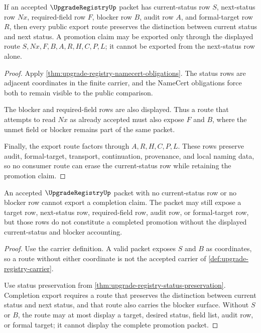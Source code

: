\begin{theorem}
\label{thm:upgrade-registry-status-preservation}
If an accepted $\UpgradeRegistryUp$ packet has current-status row $S$, next-status row $Nx$, required-field row $F$, blocker row $B$, audit row $A$, and formal-target row $R$, then every public export route preserves the distinction between current status and next status. A promotion claim may be exported only through the displayed route $S,Nx,F,B,A,R,H,C,P,L$; it cannot be exported from the next-status row alone.
\end{theorem}
\begin{proof}
Apply \autoref{thm:upgrade-registry-namecert-obligations}. The status rows are adjacent coordinates in the finite carrier, and the NameCert obligations force both to remain visible to the public comparison.

The blocker and required-field rows are also displayed. Thus a route that attempts to read $Nx$ as already accepted must also expose $F$ and $B$, where the unmet field or blocker remains part of the same packet.

Finally, the export route factors through $A,R,H,C,P,L$. These rows preserve audit, formal-target, transport, continuation, provenance, and local naming data, so no consumer route can erase the current-status row while retaining the promotion claim.
\end{proof}

\begin{theorem}
\label{thm:upgrade-registry-noncompletion-surface}
An accepted $\UpgradeRegistryUp$ packet with no current-status row or no blocker row cannot export a completion claim. The packet may still expose a target row, next-status row, required-field row, audit row, or formal-target row, but those rows do not constitute a completed promotion without the displayed current-status and blocker accounting.
\end{theorem}
\begin{proof}
Use the carrier definition. A valid packet exposes $S$ and $B$ as coordinates, so a route without either coordinate is not the accepted carrier of \autoref{def:upgrade-registry-carrier}.

Use status preservation from \autoref{thm:upgrade-registry-status-preservation}. Completion export requires a route that preserves the distinction between current status and next status, and that route also carries the blocker surface. Without $S$ or $B$, the route may at most display a target, desired status, field list, audit row, or formal target; it cannot display the complete promotion packet.
\end{proof}


